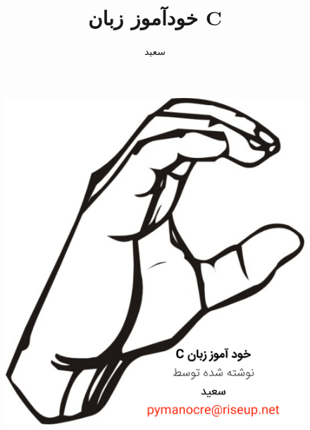 \documentclass[12pt,oneside]{book}
\title{\textbf{خودآموز زبان C}}
\author{سعید}
\begin{document}
\paragraphfootnotes
\begin{figure}
\centering
\includegraphics[width=150mm]{c_artwork}
\end{figure}
\clearpage\maketitle
\thispagestyle{empty}
\tableofcontents
{}





\end{document}
